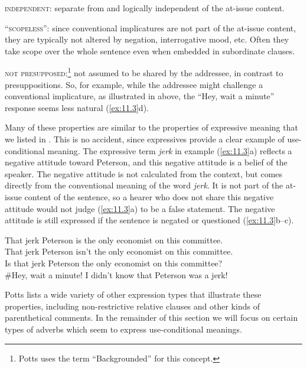 \textsc{independent}: separate from and logically independent of the at-issue content.



\textsc{“scopeless”:} since conventional implicatures are not part of the at-issue content, they are typically not altered by negation, interrogative mood, etc. Often they take scope over the whole sentence even when embedded in subordinate clauses.



\textsc{not presupposed:}\footnote{Potts uses the term “Backgrounded” for this concept.} not assumed to be shared by the addressee, in contrast to presuppositions. So, for example, while the addressee might challenge a conventional implicature, as illustrated in  above, the “Hey, wait a minute” response seems less natural (\ref{ex:11.3}d).



Many of these properties are similar to the properties of expressive meaning that we listed in . This is no accident, since expressives provide a clear example of use-conditional meaning. The expressive term \textit{jerk} in example (\ref{ex:11.3}a) reflects a negative attitude toward Peterson, and this negative attitude is a belief of the speaker. The negative attitude is not calculated from the context, but comes directly from the conventional meaning of the word \textit{jerk}. It is not part of the at-issue content of the sentence, so a hearer who does not share this negative attitude would not judge (\ref{ex:11.3}a) to be a false statement. The negative attitude is still expressed if the sentence is negated or questioned (\ref{ex:11.3}b--c).


\ea \label{ex:11.3}
\ea That jerk Peterson is the only economist on this committee.\\
\ex That jerk Peterson isn’t the only economist on this committee.\\
\ex Is that jerk Peterson the only economist on this committee?\\
\ex \#Hey, wait a minute! I didn’t know that Peterson was a jerk!
                       \z
\z


Potts lists a wide variety of other expression types that illustrate these properties, including non-restrictive relative clauses and other kinds of parenthetical comments. In the remainder of this section we will focus on certain types of adverbs which seem to express use-conditional meanings.


